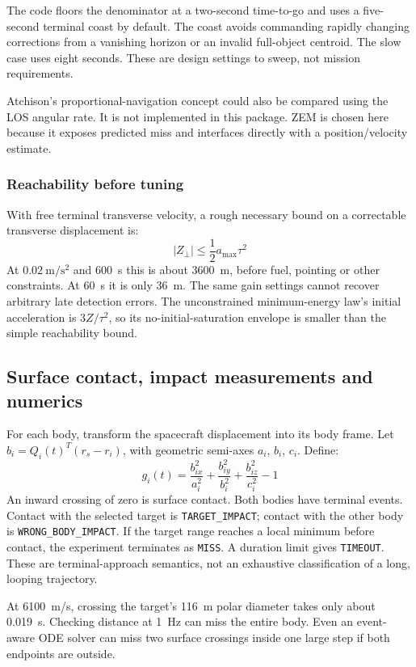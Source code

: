 \documentclass[11pt,a4paper]{article}
\begin{document}
The code floors the denominator at a two-second time-to-go and uses a five-second terminal coast by default. The coast avoids commanding rapidly changing corrections from a vanishing horizon or an invalid full-object centroid. The slow case uses eight seconds. These are design settings to sweep, not mission requirements.

Atchison's proportional-navigation concept could also be compared using the LOS angular rate. It is not implemented in this package. ZEM is chosen here because it exposes predicted miss and interfaces directly with a position/velocity estimate.

\subsubsection{Reachability before tuning}
With free terminal transverse velocity, a rough necessary bound on a correctable transverse displacement is:
\[ |Z_{\perp}| \le \frac{1}{2} a_{\mathrm{max}} \tau^{2} \]
At $0.02\mathrm{~m/s^2}$ and 600~s this is about 3600~m, before fuel, pointing or other constraints. At 60~s it is only 36~m. The same gain settings cannot recover arbitrary late detection errors. The unconstrained minimum-energy law's initial acceleration is $3Z/\tau^{2}$, so its no-initial-saturation envelope is smaller than the simple reachability bound.

\subsection{Surface contact, impact measurements and numerics}
For each body, transform the spacecraft displacement into its body frame. Let $b_{i} = Q_{i}(t)^{T} (r_{s} - r_{i})$, with geometric semi-axes $a_i$, $b_i$, $c_i$. Define:
\[ g_{i}(t) = \frac{b_{ix}^{2}}{a_{i}^{2}} + \frac{b_{iy}^{2}}{b_{i}^{2}} + \frac{b_{iz}^{2}}{c_{i}^{2}} - 1 \]
An inward crossing of zero is surface contact. Both bodies have terminal events. Contact with the selected target is \texttt{TARGET\_IMPACT}; contact with the other body is \texttt{WRONG\_BODY\_IMPACT}. If the target range reaches a local minimum before contact, the experiment terminates as \texttt{MISS}. A duration limit gives \texttt{TIMEOUT}. These are terminal-approach semantics, not an exhaustive classification of a long, looping trajectory.

At 6100~m/s, crossing the target's 116~m polar diameter takes only about 0.019~s. Checking distance at 1~Hz can miss the entire body. Even an event-aware ODE solver can miss two surface crossings inside one large step if both endpoints are outside.
\end{document}
